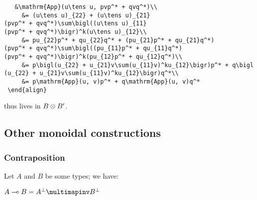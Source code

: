 \texttt{~~~\&\textbackslash{}mathrm\{App\}(u\textbackslash{}tens~u\textquotesingle{},~pvp\^{}*~+~qv\textquotesingle{}q\^{}*)\textbackslash{}\textbackslash{}}\\
\texttt{~~~~~\&=~(u\textbackslash{}tens~u\textquotesingle{})\_\{22\}~+~(u\textbackslash{}tens~u\textquotesingle{})\_\{21\}(pvp\^{}*~+~qv\textquotesingle{}q\^{}*)\textbackslash{}sum\textbackslash{}bigl((u\textbackslash{}tens~u\textquotesingle{})\_\{11\}(pvp\^{}*~+~qv\textquotesingle{}q\^{}*)\textbackslash{}bigr)\^{}k(u\textbackslash{}tens~u\textquotesingle{})\_\{12\}\textbackslash{}\textbackslash{}}\\
\texttt{~~~~~\&=~pu\_\{22\}p\^{}*~+~qu\textquotesingle{}\_\{22\}q\^{}*~+~(pu\_\{21\}p\^{}*~+~qu\textquotesingle{}\_\{21\}q\^{}*)(pvp\^{}*~+~qv\textquotesingle{}q\^{}*)\textbackslash{}sum\textbackslash{}bigl((pu\_\{11\}p\^{}*~+~qu\textquotesingle{}\_\{11\}q\^{}*)(pvp\^{}*~+~qv\textquotesingle{}q\^{}*)\textbackslash{}bigr)\^{}k(pu\_\{12\}p\^{}*~+~qu\textquotesingle{}\_\{12\}q\^{}*)\textbackslash{}\textbackslash{}}\\
\texttt{~~~~~\&=~p\textbackslash{}bigl(u\_\{22\}~+~u\_\{21\}v\textbackslash{}sum(u\_\{11\}v)\^{}ku\_\{12\}\textbackslash{}bigr)p\^{}*~+~q\textbackslash{}bigl(u\textquotesingle{}\_\{22\}~+~u\textquotesingle{}\_\{21\}v\textquotesingle{}\textbackslash{}sum(u\textquotesingle{}\_\{11\}v\textquotesingle{})\^{}ku\textquotesingle{}\_\{12\}\textbackslash{}bigr)q\^{}*\textbackslash{}\textbackslash{}}\\
\texttt{~~~~~\&=~p\textbackslash{}mathrm\{App\}(u,~v)p\^{}*~+~q\textbackslash{}mathrm\{App\}(u\textquotesingle{},~v\textquotesingle{})q\^{}*}\\
\texttt{~\textbackslash{}end\{align\}}

thus lives in \(B\otimes B'\).

\subsection{Other monoidal constructions}\label{other-monoidal-constructions}

\subsubsection{Contraposition}\label{contraposition}

Let \(A\) and \(B\) be some types; we have:

\begin{description}
\tightlist
\item[]
\(A\limp B = A\orth\limpinv B\orth\)
\end{description}


